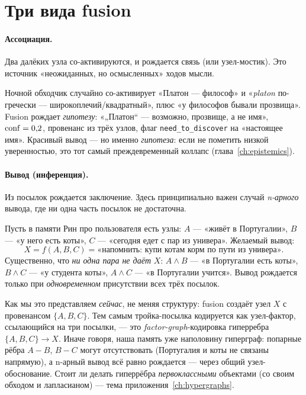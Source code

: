 \section{Три вида fusion}

\paragraph{Ассоциация.} Два далёких узла со-активируются, и рождается связь (или
узел-мостик). Это источник «неожиданных, но осмысленных» ходов мысли.

\begin{workedbox}
Ночной обходчик случайно со-активирует «Платон — философ» и «\emph{platon} по-гречески
— широкоплечий/квадратный», плюс «у философов бывали прозвища». Fusion рождает
\emph{гипотезу}: «„Платон“ — возможно, прозвище, а не имя», $\mathrm{conf}=0{,}2$,
провенанс из трёх узлов, флаг \texttt{need\_to\_discover} на «настоящее имя».
Красивый вывод — но именно \emph{гипотеза}: если не пометить низкой уверенностью,
это тот самый преждевременный коллапс (глава~\ref{ch:epistemics}).
\end{workedbox}

\paragraph{Вывод (инференция).} Из посылок рождается заключение. Здесь принципиально
важен случай \emph{n-арного} вывода, где ни одна часть посылок не достаточна.

\begin{workedbox}
Пусть в памяти Рин про пользователя есть узлы:
$A$ — «живёт в Португалии», $B$ — «у него есть коты», $C$ — «сегодня едет с пар из
универа». Желаемый вывод:
\[
X=f(A,B,C)=\text{«напомнить: купи котам корм по пути из универа»}.
\]
Существенно, что \emph{ни одна пара не даёт} $X$: $A\wedge B$ — «в Португалии есть
коты», $B\wedge C$ — «у студента коты», $A\wedge C$ — «в Португалии учится». Вывод
рождается только при \emph{одновременном} присутствии всех трёх посылок.
\end{workedbox}

Как мы это представляем \emph{сейчас}, не меняя структуру: fusion создаёт узел $X$ с
провенансом $\{A,B,C\}$. Тем самым тройка-посылка кодируется как узел-фактор,
ссылающийся на три посылки, — это \emph{factor-graph}-кодировка гиперребра
$\{A,B,C\}\to X$. Иначе говоря, наша память уже наполовину гиперграф: попарные
рёбра $A\!-\!B$, $B\!-\!C$ могут отсутствовать (Португалия и коты не связаны
напрямую), а n-арный вывод всё равно рождается — через общий узел-обоснование.
Стоит ли делать гиперрёбра \emph{первоклассными} объектами (со своим обходом и
лапласианом) — тема приложения~\ref{ch:hypergraphs}.

